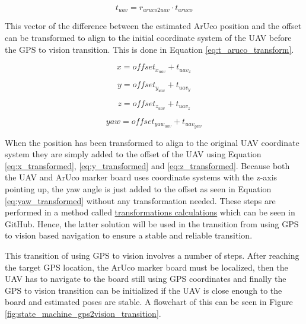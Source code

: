 \documentclass[../Head/report.tex]{subfiles}
\begin{document}
\begin{equation}
	t_{uav} = r_{aruco2uav} \cdot t_{aruco}
	\label{eq:t_aruco_transform}
\end{equation}

This vector of the difference between the estimated ArUco position and the offset can be transformed to align to the initial coordinate system of the UAV before the GPS to vision transition. This is done in Equation \ref{eq:t_aruco_transform}. 

\begin{equation}
	x = offset_{x_{uav}} + t_{uav_{x}}
	\label{eq:x_transformed}
\end{equation}

\begin{equation}
	y = offset_{y_{uav}} + t_{uav_{y}}
	\label{eq:y_transformed}
\end{equation}

\begin{equation}
	z = offset_{z_{uav}} + t_{uav_{z}}
	\label{eq:z_transformed}
\end{equation}

\begin{equation}
	yaw = offset_{yaw_{uav}} + t_{uav_{yaw}}
	\label{eq:yaw_transformed}
\end{equation}

When the position has been transformed to align to the original UAV coordinate system they are simply added to the offset of the UAV using Equation \ref{eq:x_transformed},  \ref{eq:y_transformed} and  \ref{eq:z_transformed}. Because both the UAV and ArUco marker board uses coordinate systems with the z-axis pointing up, the yaw angle is just added to the offset as seen in Equation \ref{eq:yaw_transformed} without any transformation needed. These steps are performed in a method called \href{https://github.com/Kenil16/master_project/blob/master/software/ros_workspace/src/offboard_control/transformations_calculations.py} {transformations calculations} which can be seen in GitHub. Hence, the latter solution will be used in the transition from using GPS to vision based navigation to ensure a stable and reliable transition. 

This transition of using GPS to vision involves a number of steps. After reaching the target GPS location, the ArUco marker board must be localized, then the UAV has to navigate to the board still using GPS coordinates and finally the GPS to vision transition can be initialized if the UAV is close enough to the board and estimated poses are stable. A flowchart of this can be seen in Figure \ref{fig:state_machine_gps2vision_transition}. 
\end{document}
